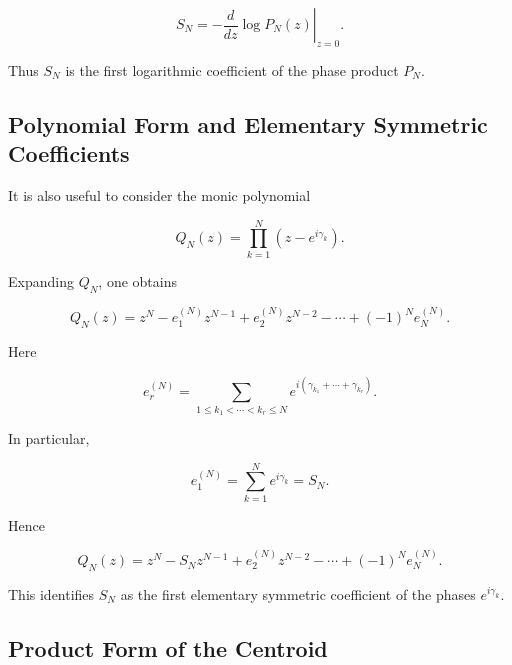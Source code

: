 \documentclass[11pt]{amsart}
\numberwithin{equation}{section}
\theoremstyle{plain}
\theoremstyle{definition}
\theoremstyle{remark}
\begin{document}
\begin{equation}
S_N
=
-
\left.
\frac{d}{dz}
\log P_N(z)
\right|_{z=0}.
\label{eq:SN_logarithmic_derivative}
\end{equation}

Thus \(S_N\) is the first logarithmic coefficient of the phase product
\(P_N\).

\subsection{Polynomial Form and Elementary Symmetric Coefficients}
\label{subsec:elementary_symmetric_coefficients}

It is also useful to consider the monic polynomial

\begin{equation}
Q_N(z)
=
\prod_{k=1}^{N}
\left(z-e^{i\gamma_k}\right).
\label{eq:monic_phase_polynomial}
\end{equation}

Expanding \(Q_N\), one obtains

\begin{equation}
Q_N(z)
=
z^N
-
e_1^{(N)}z^{N-1}
+
e_2^{(N)}z^{N-2}
-
\cdots
+
(-1)^N e_N^{(N)}.
\label{eq:monic_phase_polynomial_expansion}
\end{equation}

Here

\begin{equation}
e_r^{(N)}
=
\sum_{1\le k_1<\cdots<k_r\le N}
e^{i(\gamma_{k_1}+\cdots+\gamma_{k_r})}.
\label{eq:elementary_symmetric_phase_coefficients}
\end{equation}

In particular,

\begin{equation}
e_1^{(N)}
=
\sum_{k=1}^{N}
e^{i\gamma_k}
=
S_N.
\label{eq:first_elementary_coefficient_SN}
\end{equation}

Hence

\begin{equation}
Q_N(z)
=
z^N
-
S_N z^{N-1}
+
e_2^{(N)}z^{N-2}
-
\cdots
+
(-1)^N e_N^{(N)}.
\label{eq:monic_phase_polynomial_SN_coefficient}
\end{equation}

This identifies \(S_N\) as the first elementary symmetric coefficient
of the phases \(e^{i\gamma_k}\).

\subsection{Product Form of the Centroid}
\label{subsec:product_form_centroid}
\end{document}

